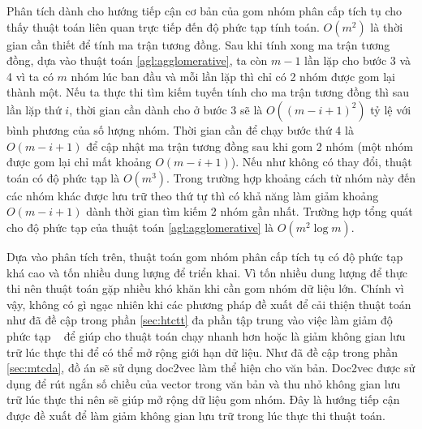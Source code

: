 Phân tích dành cho hướng tiếp cận cơ bản của gom nhóm phân cấp tích tụ cho thấy thuật toán liên quan trực tiếp đến độ phức tạp tính toán.
$O(m^2)$ là thời gian cần thiết để tính ma trận tương đồng.
Sau khi tính xong ma trận tương đồng, dựa vào thuật toán \ref{agl:agglomerative}, ta còn $m - 1$ lần lặp cho bước 3 và 4 vì ta có $m$ nhóm lúc ban đầu và mỗi lần lặp thì chỉ có 2 nhóm được gom lại thành một.
Nếu ta thực thi tìm kiếm tuyến tính cho ma trận tương đồng thì sau lần lặp thứ $i$, thời gian cần dành cho ở bước 3 sẽ là $O((m - i + 1)^2)$ tỷ lệ với bình phương của số lượng nhóm.
Thời gian cần để chạy bước thứ 4 là $O(m - i + 1)$ để cập nhật ma trận tương đồng sau khi gom 2 nhóm (một nhóm được gom lại chỉ mất khoảng $O(m - i + 1)$).
Nếu như không có thay đổi, thuật toán có độ phức tạp là $O(m^3)$.
Trong trường hợp khoảng cách từ nhóm này đến các nhóm khác được lưu trữ theo thứ tự thì có khả năng làm giảm khoảng $O(m - i + 1)$ dành thời gian tìm kiếm 2 nhóm gần nhất.
Trường hợp tổng quát cho độ phức tạp của thuật toán \ref{agl:agglomerative} là $O(m^2 \log m)$.

Dựa vào phân tích trên, thuật toán gom nhóm phân cấp tích tụ có độ phức tạp khá cao và tốn nhiều dung lượng để triển khai.
Vì tốn nhiều dung lượng để thực thi nên thuật toán gặp nhiều khó khăn khi cần gom nhóm dữ liệu lớn.
Chính vì vậy, không có gì ngạc nhiên khi các phương pháp đề xuất để cải thiện thuật toán như đã đề cập trong phần \ref{sec:htctt} đa phần tập trung vào việc làm giảm độ phức tạp ~\cite{hac-constraints, single-link-hash} để giúp cho thuật toán chạy nhanh hơn hoặc là giảm không gian lưu trữ lúc thực thi để có thể mở rộng giới hạn dữ liệu.
Như đã đề cập trong phần \ref{sec:mtcda}, đồ án sẽ sử dụng doc2vec làm thể hiện cho văn bản.
Doc2vec được sử dụng để rút ngắn số chiều của vector trong văn bản và thu nhỏ không gian lưu trữ lúc thực thi nên sẽ giúp mở rộng dữ liệu gom nhóm.
Đây là hướng tiếp cận được đề xuất để làm giảm không gian lưu trữ trong lúc thực thi thuật toán.

